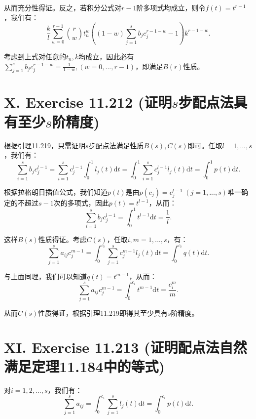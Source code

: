 \documentclass[twoside,a4paper]{article}
\begin{document}
从而充分性得证。反之，若积分公式对$r-1$阶多项式均成立，则令$f(t)=t^{r-1}$，我们有：
\begin{equation*}
    \frac{k}{l}\sum_{w=0}^{r-1} \binom{r}{w}t_n^w\left((1-w)\sum_{j=1}^s b_jc_j^{r-1-w}-1\right)k^{r-1-w}.
\end{equation*}

考虑到上式对任意的$t_n,k$均成立，因此必有$\sum_{j=1}^s b_jc_j^{r-1-w}=\frac{1}{1-w},(w=0,...,r-1)$，即满足$B(r)$性质。

\section*{X. Exercise 11.212 (证明$s$步配点法具有至少$s$阶精度)}

\;\;\;\;\;\;根据引理11.219，只需证明$s$步配点法满足性质$B(s),C(s)$即可。任取$l=1,...,s$，我们有：
\begin{equation*}
    \sum_{i=1}^s b_jc_j^{l-1}=\sum_{i=1}^s c_j^{l-1} \int_0^1 l_j(t) \text{d}t=\int_0^1\sum_{i=1}^s c_j^{l-1} l_j(t) \text{d}t=\int_0^1 p(t) \text{d}t.
\end{equation*}

根据拉格朗日插值公式，我们知道$p(t)$是由$p(c_j)=c_j^{l-1}\;(j=1,...,s)$唯一确定的不超过$s-1$次的多项式，因此$p(t)=t^{l-1}$，从而：
\begin{equation*}
    \sum_{i=1}^s b_jc_j^{l-1}=\int_0^1 t^{l-1} \text{d}t=\frac{1}{l}.
\end{equation*}

这样$B(s)$性质得证。考虑$C(s)$，任取$i,m=1,...,s$，有：
\begin{equation*}
    \sum_{j=1}^s a_{ij}c_j^{m-1}=\int_{0}^{c_i}\sum_{j=1}^sc_j^{m-1}l_j(t)\text{d}t=\int_{0}^{c_i}q(t)\text{d}t.
\end{equation*}

与上面同理，我们可以知道$q(t)=t^{m-1}$，从而：
\begin{equation*}
    \sum_{j=1}^s a_{ij}c_j^{m-1}=\int_{0}^{c_i}t^{m-1}\text{d}t=\frac{c_i^m}{m}.
\end{equation*}

从而$C(s)$性质得证，根据引理11.219即得其至少具有$s$阶精度。

\section*{XI. Exercise 11.213 (证明配点法自然满足定理11.184中的等式)}

\;\;\;\;\;\;对$i=1,2,...,s$，我们有：
\begin{equation*}
    \sum_{j=1}^s a_{ij}=\int_{0}^{c_i}\sum_{j=1}^sl_j(t)\text{d}t=\int_{0}^{c_i}p(t)\text{d}t.
\end{equation*}
\end{document}
